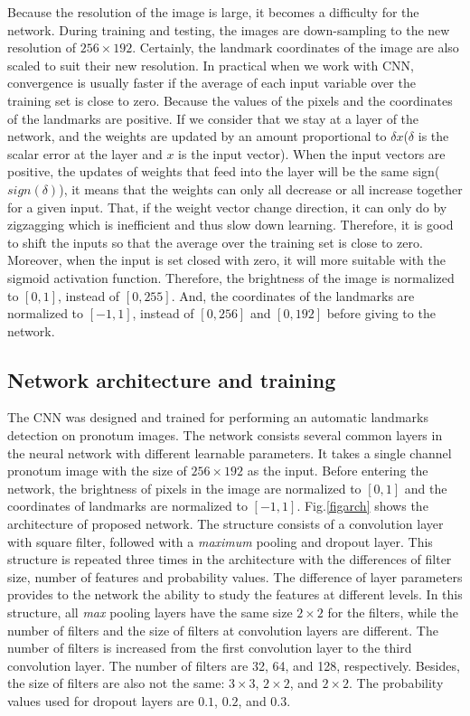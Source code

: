 \documentclass[conference]{IEEEtran}
\begin{document}
Because the resolution of the image is large, it becomes a difficulty for the network. During training and testing, the images are down-sampling to the new resolution of $256 \times 192$. Certainly, the landmark coordinates of the image are also scaled to suit their new resolution. In practical when we work with CNN, convergence is usually faster if the average of each input variable over the training set is close to zero. Because the values of the pixels and the coordinates of the landmarks are positive. If we consider that we stay at a layer of the network, and the weights are updated by an amount proportional to $\delta x$($\delta$ is the scalar error at the layer and $x$ is the input vector). When the input vectors are positive, the updates of weights that feed into the layer will be the same sign($sign(\delta)$), it means that the weights can only all decrease or all increase together for a given input. That, if the weight vector change direction, it can only do by zigzagging which is inefficient and thus slow down learning. Therefore, it is good to shift the inputs so that the average over the training set is close to zero. Moreover, when the input is set closed with zero, it will more suitable with the sigmoid activation function\cite{lecun2012efficient}. Therefore, the brightness of the image is normalized to $[0,1]$, instead of $[0,255]$. And, the coordinates of the landmarks are normalized to $[-1,1]$, instead of $[0,256]$ and $[0,192]$ before giving to the network.
\subsection{Network architecture and training}
The CNN was designed and trained for performing an automatic landmarks detection on pronotum images. The network consists several common layers in the neural network with different learnable parameters. It takes a single channel pronotum image with the size of  $256 \times 192$ as the input. Before entering the network, the brightness of pixels in the image are normalized to $[0,1]$ and the coordinates of landmarks are normalized to $[-1,1]$. Fig.\ref{figarch} shows the architecture of proposed network. The structure consists of a convolution layer with square filter, followed with a \textit{maximum} pooling and dropout layer. This structure is repeated three times in the architecture with the differences of filter size, number of features and probability values. The difference of layer parameters provides to the network the ability to study the features at different levels. In this structure, all \textit{max} pooling layers have the same size $2 \times 2$ for the filters, while the number of filters and the size of filters at convolution layers are different. The number of filters is increased from the first convolution layer to the third convolution layer. The number of filters are 32, 64, and 128, respectively. Besides, the size of filters are also not the same: $3 \times 3$, $2 \times 2$, and $2 \times 2$. The probability values used for dropout layers are $0.1$, $0.2$, and $0.3$.
\end{document}

